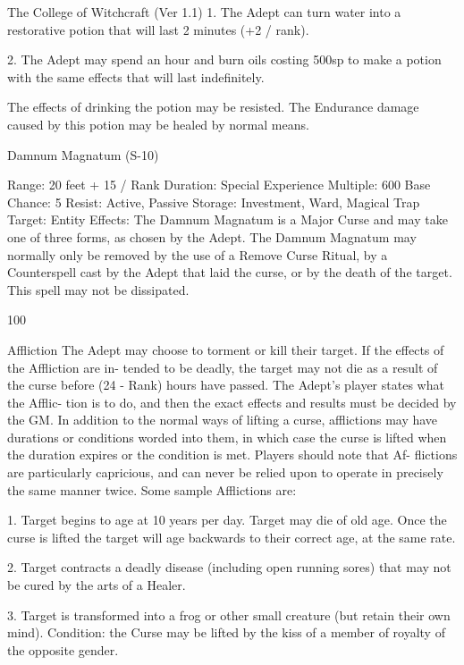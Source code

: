 \begin{Chapter}{The College of Witchcraft (Ver 1.1)}
1.  The  Adept  can  turn  water  into  a  restorative 
potion that will last 2 minutes (+2 / rank). 

2.  The  Adept  may  spend  an  hour  and  burn  oils 
costing  500sp  to  make  a  potion  with  the  same 
effects that will last indefinitely. 

The effects of drinking the potion may be resisted. 
The Endurance damage caused by this potion may 
be healed by normal means. 

Damnum Magnatum (S-10) 

Range: 20 feet + 15 / Rank 
Duration: Special 
Experience Multiple: 600 
Base Chance: 5%
Resist: Active, Passive 
Storage: Investment, Ward, Magical Trap 
Target: Entity 
Effects: The Damnum Magnatum is a Major Curse 
and may take one of three forms, as chosen by the 
Adept.  The  Damnum  Magnatum  may  normally 
only  be  removed  by  the  use  of  a  Remove  Curse 
Ritual,  by  a  Counterspell  cast  by  the  Adept  that 
laid  the  curse,  or  by  the  death  of  the  target.  This 
spell may not be dissipated. 

100 

Affliction The Adept may choose to torment or kill 
their  target.  If  the  effects  of  the  Affliction  are  in-
tended  to  be  deadly,  the  target  may  not  die  as  a 
result  of  the  curse  before  (24  -  Rank)  hours  have 
passed.  The  Adept’s  player  states  what  the  Afflic-
tion is to do, and then the exact effects and results 
must  be  decided  by  the  GM.  In  addition  to  the 
normal ways of lifting a curse, afflictions may have 
durations or conditions worded into them, in which 
case the curse is lifted when the duration expires or 
the  condition  is  met.  Players  should  note  that  Af-
flictions  are  particularly  capricious,  and  can  never 
be  relied  upon  to  operate  in  precisely  the  same 
manner twice. Some sample Afflictions are: 

1. Target begins to age at 10 years per day. Target 
may  die  of  old  age.  Once  the  curse  is  lifted  the 
target  will  age  backwards  to  their  correct  age,  at 
the same rate. 

2.  Target  contracts  a  deadly  disease  (including 
open  running  sores)  that  may  not  be  cured  by  the 
arts of a Healer. 

3.  Target  is  transformed  into a  frog  or  other  small 
creature (but retain their own mind). Condition: the 
Curse  may  be  lifted  by  the  kiss  of  a  member  of 
royalty of the opposite gender. 


\end{Chapter}
